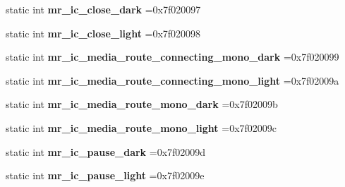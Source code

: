 \begin{DoxyCompactItemize}
static int {\bfseries mr\+\_\+ic\+\_\+close\+\_\+dark} =0x7f020097
\item 
\mbox{\label{classandroid_1_1support_1_1graphics_1_1drawable_1_1R_1_1drawable_a8225a9b73ee4d3c3ea66a1faaea87717}} 
static int {\bfseries mr\+\_\+ic\+\_\+close\+\_\+light} =0x7f020098
\item 
\mbox{\label{classandroid_1_1support_1_1graphics_1_1drawable_1_1R_1_1drawable_a1f0c1cf968ae5f12a2aad2259bd65f71}} 
static int {\bfseries mr\+\_\+ic\+\_\+media\+\_\+route\+\_\+connecting\+\_\+mono\+\_\+dark} =0x7f020099
\item 
\mbox{\label{classandroid_1_1support_1_1graphics_1_1drawable_1_1R_1_1drawable_a80966a9797fbf87a1961e31585176b11}} 
static int {\bfseries mr\+\_\+ic\+\_\+media\+\_\+route\+\_\+connecting\+\_\+mono\+\_\+light} =0x7f02009a
\item 
\mbox{\label{classandroid_1_1support_1_1graphics_1_1drawable_1_1R_1_1drawable_aee4982d6fdaf5a5cd28db8ee76fb94b2}} 
static int {\bfseries mr\+\_\+ic\+\_\+media\+\_\+route\+\_\+mono\+\_\+dark} =0x7f02009b
\item 
\mbox{\label{classandroid_1_1support_1_1graphics_1_1drawable_1_1R_1_1drawable_a6b6d079ceb850450c5128f9fcec8d39a}} 
static int {\bfseries mr\+\_\+ic\+\_\+media\+\_\+route\+\_\+mono\+\_\+light} =0x7f02009c
\item 
\mbox{\label{classandroid_1_1support_1_1graphics_1_1drawable_1_1R_1_1drawable_a3798957f8be7721cf823a1d4a6dc3ef2}} 
static int {\bfseries mr\+\_\+ic\+\_\+pause\+\_\+dark} =0x7f02009d
\item 
\mbox{\label{classandroid_1_1support_1_1graphics_1_1drawable_1_1R_1_1drawable_acd4b0f1c196e753b53eaec85f6c6a4c6}} 
static int {\bfseries mr\+\_\+ic\+\_\+pause\+\_\+light} =0x7f02009e
\item 

\end{DoxyCompactItemize}
